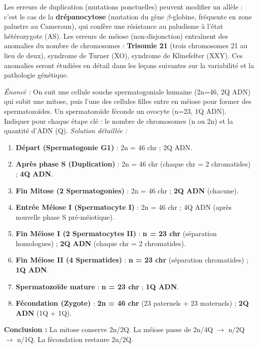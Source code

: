 \documentclass[11pt]{article}
\begin{document}
\begin{savaistu}
Les erreurs de duplication (mutations ponctuelles) peuvent modifier un allèle : c'est le cas de la \textbf{drépanocytose} (mutation du gène $\beta$-globine, fréquente en zone palustre au Cameroun), qui confère une résistance au paludisme à l'état hétérozygote (AS).
Les erreurs de méiose (non-disjonction) entraînent des anomalies du nombre de chromosomes : \textbf{Trisomie 21} (trois chromosomes 21 au lieu de deux), syndrome de Turner (XO), syndrome de Klinefelter (XXY). Ces anomalies seront étudiées en détail dans les leçons suivantes sur la variabilité et la pathologie génétique.
\end{savaistu}

\begin{exoresolu}
\emph{Énoncé :} On suit une cellule souche spermatogoniale humaine (2n=46, 2Q ADN) qui subit une mitose, puis l'une des cellules filles entre en méiose pour former des spermatozoïdes. Un spermatozoïde féconde un ovocyte (n=23, 1Q ADN). Indiquer pour chaque étape clé : le nombre de chromosomes (n ou 2n) et la quantité d'ADN (Q).
\tcblower
\emph{Solution détaillée :}
\begin{enumerate}
    \item \textbf{Départ (Spermatogonie G1)} : 2n = 46 chr ; 2Q ADN.
    \item \textbf{Après phase S (Duplication)} : 2n = 46 chr (chaque chr = 2 chromatides) ; \textbf{4Q ADN}.
    \item \textbf{Fin Mitose (2 Spermatogonies)} : 2n = 46 chr ; \textbf{2Q ADN} (chacune).
    \item \textbf{Entrée Méiose I (Spermatocyte I)} : 2n = 46 chr ; 4Q ADN (après nouvelle phase S pré-méiotique).
    \item \textbf{Fin Méiose I (2 Spermatocytes II)} : \textbf{n = 23 chr} (séparation homologues) ; \textbf{2Q ADN} (chaque chr = 2 chromatides).
    \item \textbf{Fin Méiose II (4 Spermatides)} : \textbf{n = 23 chr} (séparation chromatides) ; \textbf{1Q ADN}.
    \item \textbf{Spermatozoïde mature} : \textbf{n = 23 chr} ; \textbf{1Q ADN}.
    \item \textbf{Fécondation (Zygote)} : \textbf{2n = 46 chr} (23 paternels + 23 maternels) ; \textbf{2Q ADN} (1Q + 1Q).
\end{enumerate}
\textbf{Conclusion :} La mitose conserve 2n/2Q. La méiose passe de 2n/4Q $\rightarrow$ n/2Q $\rightarrow$ n/1Q. La fécondation restaure 2n/2Q.
\end{exoresolu}
\end{document}
